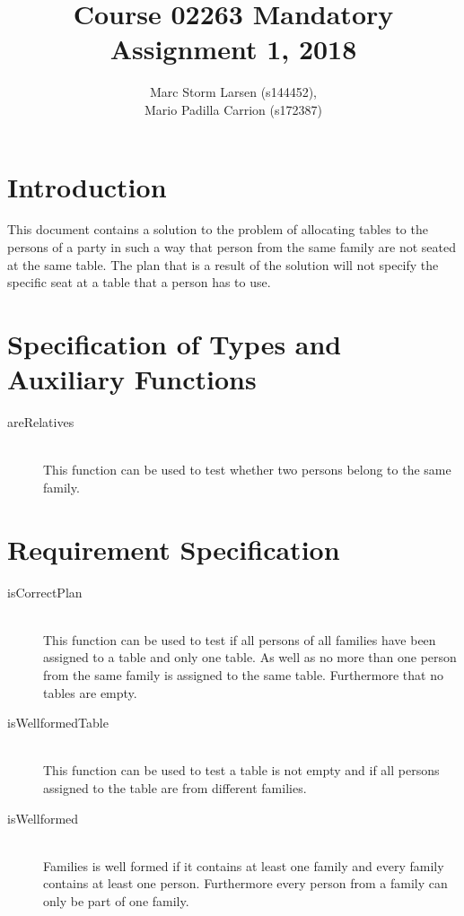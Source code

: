 \documentclass[a4]{article}
\title{Course 02263 Mandatory Assignment 1, 2018}
\author{Marc Storm Larsen (s144452),\\ 
        Mario Padilla Carrion (s172387)}
\begin{document}
\maketitle

\tableofcontents
\newpage

\section{Introduction}
This document contains a solution to the problem of allocating tables to the persons of a party in such a way that person from the same family are not seated at the same table. The plan that is a result of the solution will not specify the specific seat at a table that a person has to use.

\section{Specification of Types and Auxiliary Functions}

  

\begin{description}
  \item[areRelatives] \hfill \\ This function can be used to test whether two persons belong to the same family.
\end{description}

\section{Requirement Specification}

   

\begin{description}
  \item[isCorrectPlan] \hfill \\ This function can be used to test if all persons of all families have been assigned to a table and only one table. As well as no more than one person from the same family is assigned to the same table. Furthermore that no tables are empty.
  \item[isWellformedTable] \hfill \\ This function can be used to test a table is not empty and if all persons assigned to the table are from different families.
  \item[isWellformed] \hfill \\ Families is well formed if it contains at least one family and every family contains at least one person. Furthermore every person from a family can only be part of one family.
\end{description}
\end{document}
